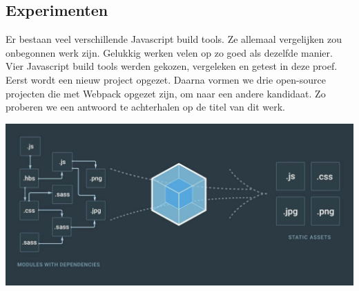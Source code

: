 \documentclass[a0,portrait]{a0poster}
\begin{document}
\begin{multicols}{2}

\color{Black} %
\color{HoGentAccent1} 
\section*{Experimenten}
\color{black}
Er bestaan veel verschillende Javascript build tools. Ze allemaal vergelijken zou onbegonnen werk zijn. Gelukkig werken velen op zo goed als dezelfde manier. 
Vier Javascript build tools werden gekozen, vergeleken en getest in deze proef. Eerst wordt een nieuw project opgezet. Daarna vormen we drie open-source projecten die met Webpack opgezet zijn, om naar een andere kandidaat. Zo proberen we een antwoord te achterhalen op de titel van dit werk.

\color{black}
\begin{center}\vspace{1cm}
\includegraphics[width=1.0\linewidth]{./Webpack.jpg}
\end{center}\vspace{1cm}



\color{HoGentAccent1} 

\end{multicols}
\end{document}
